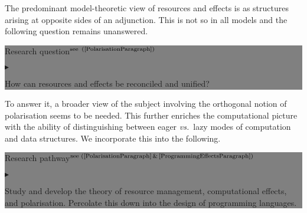\documentclass[11pt,twocolumn]{article}
\newenvironment{btritemize}
  {\begin{list}{\btr}
  {\setlength{\topsep}{2pt}
   \setlength{\partopsep}{2pt}
   \setlength{\itemsep}{2.5pt}
   \setlength{\parsep}{2.5pt}
   \setlength{\leftmargin}{1em}
   \setlength{\labelwidth}{.5em}}}
  {\end{list}}
\newcommand{\mytextsf}[1]{\textsf{\small #1}}
\newcommand{\hide}[1]{}
\newcommand{\pref}[1]{\,(\ref{#1})}
\newcommand{\eg}{\emph{eg.}}
\newcommand{\vs}{\emph{vs.}}
\newcommand{\btr}{$\blacktriangleright$}
\newcommand{\reqpsize}{8.113395cm}%
\newcommand{\req}[2]{\begin{center}\colorbox{grey}{\begin{minipage}{\reqpsize} 
  \mytextsf{Research question}\hfill$^{\mbox{\scriptsize see #1 }}$\\[-5.5mm]
  \begin{btritemize}
  \item #2
  \end{btritemize}
\end{minipage}}\end{center}}
\newcommand{\rep}[2]{\begin{center}\colorbox{grey}{\begin{minipage}{\reqpsize}
  \mytextsf{Research pathway}\hfill$^{\mbox{\scriptsize see #1 }}$\\[-5.5mm]
  \begin{btritemize}
  \item #2
  \end{btritemize}
\end{minipage}}\end{center}}
\newcommand{\cat}[1]{\mathscr{#1}}
\begin{document}
\hide{
From the viewpoint of categorical models, the resource and effect management
structures are respectively seen as comonadic and monadic structures.
Comonads and monads being dual categorical concepts that arose in the context
of cohomology theory in the 1960s~\cite{BeckThesis}.

A classical basic result of category theory establishes a strong
correspondence between (co)monads and adjoint functors
(see~\eg~\cite{MacLane}).  One aspect of this is that every adjunction
  \begin{equation}\label{ResourceEffectAdjunction}
  \xymatrix@C=40pt{
    \cat D \ar@/^.75em/[r]|(.625){\mbox{$\,G\,$}}\ar@{}[r]|-\swvdash&
    \ar@/^.75em/[l]|(.625){\mbox{$\,F\,$}} \cat C }
\end{equation}
with $F$ and $G$ respectively left and right adjoint to each other, gives
rise (by composition) to a comonad on $\cat D$ and a monad on $\cat C$.  This
viewpoint gave impetus to further analyses based on the more primitive notion
of adjunction.  

Models of Linear Logic are founded on the theory of
monoidal categories~\cite[Chapter~VII.1]{MacLane}.  For them, one requests
that the adjunction be monoidal with respect to linear structure on $\cat D$
and cartesian (or multiplicative) structure on $\cat C$
(see~\eg~\cite{MelliesCMLL}).  On the other hand, models of Computational
\mbox{$\lambda$-calculi} rely on enriched category theory~\cite{KellyBook}.
Here, the structure is roughly given by an enriched adjunction with $\cat C$
cartesian and $\cat D$ with powers (or exponentials) relative to $\cat C$.
}

\hide{
In the context of Linear Logic, examples are the mixed linear/cartesian models
and calculi of Benton and Wadler, %
and of Barber and Plotkin. %
In the context of effect calculi, examples are the Call-By-Push-Value of
Levy. %
and the Enriched Effect Calculus of 
Egger, M{\o}gelberg, and Simpson. %
}
The predominant model-theoretic view of resources and effects is as
structures arising at opposite sides of an adjunction.  This is not so in
all models and the following question remains unanswered.
%
\req{\pref{PolarisationParagraph}}
  {How can resources and effects be reconciled and unified?}
%
To answer it, a broader view of the subject involving the orthogonal
notion of polarisation seems to be needed.  
This %
further enriches the computational picture with the ability of
distinguishing between eager \vs~lazy modes of computation and data
structures.  We incorporate this into the following.
%
\rep{(\ref{PolarisationParagraph}\,\&\,\ref{ProgrammingEffectsParagraph})}
  {Study and develop the theory of resource management, computational
    effects, and polarisation.  Percolate this down into the design of
    programming languages.}
\end{document}
